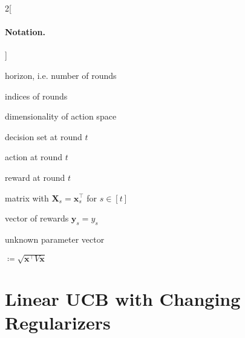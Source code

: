 \documentclass{article}
\renewcommand{\vec}[1]{\bm{#1}}
\newcommand{\defeq}{\coloneq}
\newcommand{\Real}{\mathds{R}}
\providecommand\transp{\top}
\let\transpsymbol\transp
\renewcommand{\transp}[1]{#1^\transpsymbol}
\newcommand{\Dset}[1]{\mathcal{D}_{#1}}
\begin{document}
\begin{multicols}{2}[\paragraph{Notation.}\label{sec:notation}]
  \nolinenumbers
  \begin{description}[style=sameline,leftmargin=5em]
  \item[$n$] horizon, i.e. number of rounds
  \item[$s,t$] indices of rounds
  \item[$d$] dimensionality of action space
  \item[$\Dset{t}\subset\Real^d$] decision set at round $t$
  \item[$\vec x_t \in \Dset{t}$] action at round $t$
  \item[$y_t \in \Real$] reward at round $t$
  \item[$\vec X_t \in \Real^{t\times d}$] matrix with $\vec X_s = \transp{\vec
      x_s}$ for $s\in[t]$
  \item[$\vec y_t \in \Real^t$] vector of rewards $\vec y_s = y_s$
  \item[$\vec\theta^* \in \Real^d$] unknown parameter vector
  \item[$\norm{V}{\vec x}$] $\defeq \sqrt{\transp{\vec x} V \vec x}$
  \end{description}
  \linenumbers
\end{multicols}

\section{Linear UCB with Changing Regularizers}
\label{sec:LinUCB}
\end{document}
